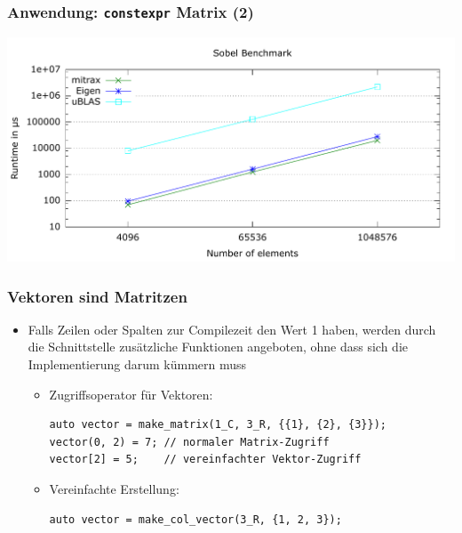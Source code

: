 \documentclass{beamer}
\begin{document}
\begin{frame}
    \frametitle{Anwendung: \texttt{constexpr} Matrix (2)}
    \includegraphics[width=\textwidth]{images/sobel2.pdf}
\end{frame}
\begin{frame}[fragile]
    \frametitle{Vektoren sind Matritzen}
    \begin{itemize}
        \item Falls Zeilen oder Spalten zur Compilezeit den Wert 1 haben, werden durch die Schnittstelle zusätzliche Funktionen angeboten, ohne dass sich die Implementierung darum kümmern muss
        \begin{itemize}
            \item Zugriffsoperator für Vektoren:
\begin{verbatim}
auto vector = make_matrix(1_C, 3_R, {{1}, {2}, {3}});
vector(0, 2) = 7; // normaler Matrix-Zugriff
vector[2] = 5;    // vereinfachter Vektor-Zugriff
\end{verbatim}
            \item Vereinfachte Erstellung:
\begin{verbatim}
auto vector = make_col_vector(3_R, {1, 2, 3});
\end{verbatim}
        \end{itemize}
    \end{itemize}
\end{frame}
\end{document}
